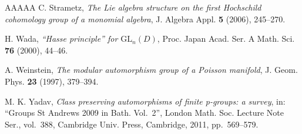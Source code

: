 \documentclass[11pt,reqno]{amsart}
\numberwithin{equation}{section}
\theoremstyle{definition}
\begin{document}
\begin{thebibliography}{AAAAA}
C. Strametz,
{\it The Lie algebra structure on the first Hochschild cohomology
group of a monomial algebra}, J. Algebra Appl. {\bf 5} (2006), 245--270.




H. Wada,
\emph{``Hasse principle'' for $\mathrm{GL}_n(D)$},
Proc. Japan Acad. Ser. A Math. Sci. {\bf 76} (2000), 44--46.

A. Weinstein,
{\it The modular automorphism group of a Poisson manifold},
J. Geom. Phys. {\bf 23} (1997), 379--394.

M. K. Yadav,
\emph{Class preserving automorphisms of finite p-groups: a survey},
in: ``Groups St Andrews 2009 in Bath. Vol.~2'',
London Math. Soc. Lecture Note Ser., vol.~388,
Cambridge Univ. Press, Cambridge, 2011, pp.~569--579.

\end{thebibliography}


\enddocument
\end{document}
